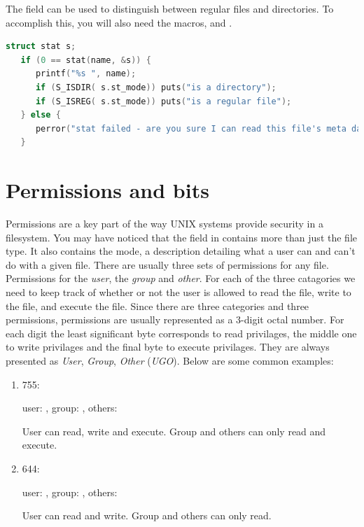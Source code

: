 The  field can be used to distinguish between regular files and directories. To accomplish this, you will also need the macros,  and .

\begin{lstlisting}[language=C]
   struct stat s;
   if (0 == stat(name, &s)) {
      printf("%s ", name);
      if (S_ISDIR( s.st_mode)) puts("is a directory");
      if (S_ISREG( s.st_mode)) puts("is a regular file");
   } else {
      perror("stat failed - are you sure I can read this file's meta data?");
   }
\end{lstlisting}

\section{Permissions and bits}

Permissions are a key part of the way UNIX systems provide security in a filesystem. You may have noticed that the  field in  contains more than just the file type. It also contains the mode, a description detailing what a user can and can't do with a given file. There are usually three sets of permissions for any file. Permissions for the \emph{user}, the \emph{group} and \emph{other}. For each of the three catagories we need to keep track of whether or not the user is allowed to read the file, write to the file, and execute the file. Since there are three categories and three permissions, permissions are usually represented as a 3-digit octal number. For each digit the least significant byte corresponds to read privilages, the middle one to write privilages and the final byte to execute privilages. They are always presented as \emph{User}, \emph{Group}, \emph{Other} (\emph{UGO}). Below are some common examples:

\begin{enumerate}

\item 755: 

user: , group: , others: 

User can read, write and execute. Group and others can only read and execute.

\item 644: 

user: , group: , others: 

User can read and write. Group and others can only read.

\end{enumerate}

